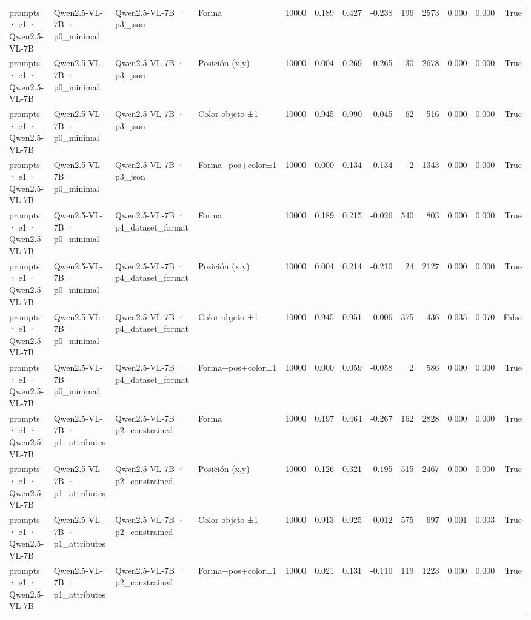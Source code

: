 \begin{tabular}{llllrrrrrrrrr}
prompts · e1 · Qwen2.5-VL-7B & Qwen2.5-VL-7B · p0\_minimal & Qwen2.5-VL-7B · p3\_json & Forma & 10000 & 0.189 & 0.427 & -0.238 & 196 & 2573 & 0.000 & 0.000 & True \\
prompts · e1 · Qwen2.5-VL-7B & Qwen2.5-VL-7B · p0\_minimal & Qwen2.5-VL-7B · p3\_json & Posición (x,y) & 10000 & 0.004 & 0.269 & -0.265 & 30 & 2678 & 0.000 & 0.000 & True \\
prompts · e1 · Qwen2.5-VL-7B & Qwen2.5-VL-7B · p0\_minimal & Qwen2.5-VL-7B · p3\_json & Color objeto ±1 & 10000 & 0.945 & 0.990 & -0.045 & 62 & 516 & 0.000 & 0.000 & True \\
prompts · e1 · Qwen2.5-VL-7B & Qwen2.5-VL-7B · p0\_minimal & Qwen2.5-VL-7B · p3\_json & Forma+pos+color±1 & 10000 & 0.000 & 0.134 & -0.134 & 2 & 1343 & 0.000 & 0.000 & True \\
prompts · e1 · Qwen2.5-VL-7B & Qwen2.5-VL-7B · p0\_minimal & Qwen2.5-VL-7B · p4\_dataset\_format & Forma & 10000 & 0.189 & 0.215 & -0.026 & 540 & 803 & 0.000 & 0.000 & True \\
prompts · e1 · Qwen2.5-VL-7B & Qwen2.5-VL-7B · p0\_minimal & Qwen2.5-VL-7B · p4\_dataset\_format & Posición (x,y) & 10000 & 0.004 & 0.214 & -0.210 & 24 & 2127 & 0.000 & 0.000 & True \\
prompts · e1 · Qwen2.5-VL-7B & Qwen2.5-VL-7B · p0\_minimal & Qwen2.5-VL-7B · p4\_dataset\_format & Color objeto ±1 & 10000 & 0.945 & 0.951 & -0.006 & 375 & 436 & 0.035 & 0.070 & False \\
prompts · e1 · Qwen2.5-VL-7B & Qwen2.5-VL-7B · p0\_minimal & Qwen2.5-VL-7B · p4\_dataset\_format & Forma+pos+color±1 & 10000 & 0.000 & 0.059 & -0.058 & 2 & 586 & 0.000 & 0.000 & True \\
prompts · e1 · Qwen2.5-VL-7B & Qwen2.5-VL-7B · p1\_attributes & Qwen2.5-VL-7B · p2\_constrained & Forma & 10000 & 0.197 & 0.464 & -0.267 & 162 & 2828 & 0.000 & 0.000 & True \\
prompts · e1 · Qwen2.5-VL-7B & Qwen2.5-VL-7B · p1\_attributes & Qwen2.5-VL-7B · p2\_constrained & Posición (x,y) & 10000 & 0.126 & 0.321 & -0.195 & 515 & 2467 & 0.000 & 0.000 & True \\
prompts · e1 · Qwen2.5-VL-7B & Qwen2.5-VL-7B · p1\_attributes & Qwen2.5-VL-7B · p2\_constrained & Color objeto ±1 & 10000 & 0.913 & 0.925 & -0.012 & 575 & 697 & 0.001 & 0.003 & True \\
prompts · e1 · Qwen2.5-VL-7B & Qwen2.5-VL-7B · p1\_attributes & Qwen2.5-VL-7B · p2\_constrained & Forma+pos+color±1 & 10000 & 0.021 & 0.131 & -0.110 & 119 & 1223 & 0.000 & 0.000 & True \\

\end{tabular}
